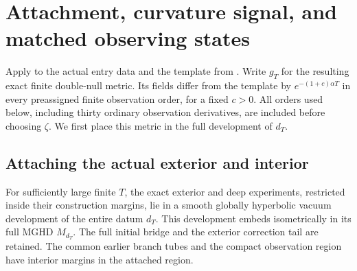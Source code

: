 \section{Attachment, curvature signal, and matched observing states}
\label{at:section}

Apply  to the actual entry data and the
template from . Write $g_T$ for the
resulting exact finite double-null metric. Its fields differ from
the template by $e^{-(1+c)\alpha T}$ in every preassigned finite
observation order, for a fixed $c>0$. All orders used below,
including thirty ordinary observation derivatives, are included
before choosing $\zeta$. We first place this metric in the full
development of $d_T$.

\subsection{Attaching the actual exterior and interior}

\begin{proposition}
\label{prop:experiment-attachment}
For sufficiently large finite $T$, the exact exterior and deep
experiments, restricted inside their construction margins, lie
in a smooth globally hyperbolic vacuum development of the entire
datum $d_T$. This development embeds isometrically in its full
MGHD $M_{d_T}$. The full initial bridge and the exterior correction
tail are retained. The common earlier branch tubes and the compact
observation region have interior margins in the attached region.
\end{proposition}

